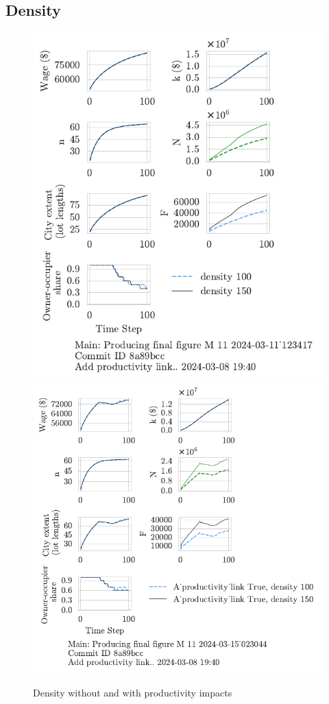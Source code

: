 \subsection{Density}
\begin{figure}[h!tb] 
    \centering
    \includegraphics[scale=.75, trim={0 1.4cm 1.5cm 0},clip]{fig/density-Main-123417.pdf} 
    \includegraphics[scale=.75, trim={0 1.4cm 3.2cm 0},clip]{fig/With-productivity_link-density-023044.pdf} 
    \caption{Density without and with productivity impacts}
    \label{fig:Productivity_link_W-WO-density}
\end{figure}

